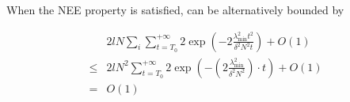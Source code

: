 When the NEE property is satisfied, can be alternatively bounded by

$$
\begin{aligned}
& 2 l N \sum_{i} \sum_{t=T_0}^{+\infty} 2 \exp \left(-2 \frac{\lambda_{\min}^2 t^2}{\delta^2 N^2 t}\right) + O(1) \\
\leqslant & 2 l N^2 \sum_{t=T_0}^{+\infty} 2 \exp \left(-\left(2 \frac{\lambda_{\min}^2}{\delta^2 N^2}\right) \cdot t\right)+O(1) \\
= & O(1)
\end{aligned}
$$

\newpage
